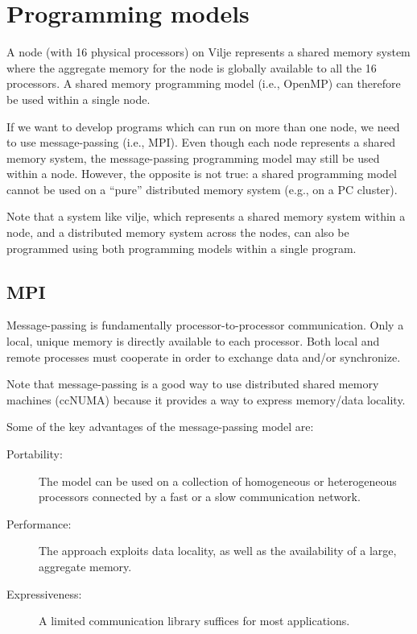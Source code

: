 
\section{Programming models} %
\label{sec:programming_models}
A node (with 16 physical processors) on Vilje represents a shared memory system where the aggregate memory for the node is globally available to all the 16 processors. A shared memory programming model (i.e., OpenMP) can therefore be used within a single node.

If we want to develop programs which can run on more than one node, we need to use message-passing (i.e., MPI). Even though each node represents a shared memory system, the message-passing programming model may still be used within a node. However, the opposite is not true: a shared programming model cannot be used on a ``pure'' distributed memory system (e.g., on a PC cluster).

Note that a system like vilje, which represents a shared memory system within a node, and a distributed memory system across the nodes, can also be programmed using both programming models within a single program.

\subsection{MPI} %
\label{sub:mpi}
Message-passing is fundamentally processor-to-processor communication. Only a local, unique memory is directly available to each processor. Both local and remote processes must cooperate in order to exchange data and/or synchronize.

Note that message-passing is a good way to use distributed shared memory machines (ccNUMA) because it provides a way to express memory/data locality.

Some of the key advantages of the message-passing model are:
\begin{description}
  \item[Portability:]  The model can be used on a collection of homogeneous or heterogeneous processors connected by a fast or a slow communication network.
  \item[Performance:] The approach exploits data locality, as well as the availability of a large, aggregate memory.
  \item[Expressiveness:] A limited communication library suffices for most applications.
\end{description}

